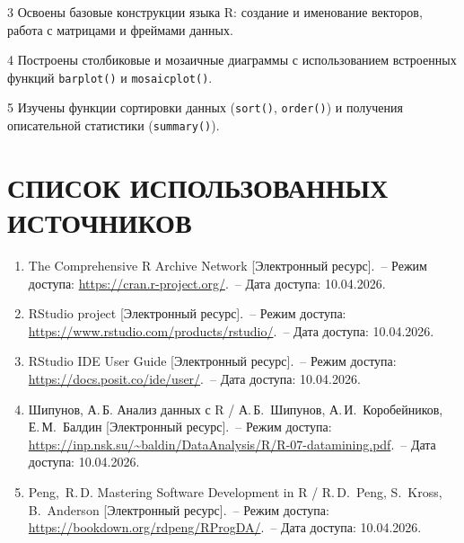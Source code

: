 \documentclass[14pt,a4paper]{extarticle}
\begin{document}
3 Освоены базовые конструкции языка R: создание и именование векторов, работа с матрицами и фреймами данных.

4 Построены столбиковые и мозаичные диаграммы с использованием встроенных функций \texttt{barplot()} и \texttt{mosaicplot()}.

5 Изучены функции сортировки данных (\texttt{sort()}, \texttt{order()}) и получения описательной статистики (\texttt{summary()}).

\newpage

\section*{СПИСОК ИСПОЛЬЗОВАННЫХ ИСТОЧНИКОВ}

\begin{enumerate}[label=\arabic*,leftmargin=1.25cm]
  \item The Comprehensive R Archive Network [Электронный ресурс].~-- Режим доступа: \url{https://cran.r-project.org/}.~-- Дата доступа: 10.04.2026.
  \item RStudio project [Электронный ресурс].~-- Режим доступа: \url{https://www.rstudio.com/products/rstudio/}.~-- Дата доступа: 10.04.2026.
  \item RStudio IDE User Guide [Электронный ресурс].~-- Режим доступа: \url{https://docs.posit.co/ide/user/}.~-- Дата доступа: 10.04.2026.
  \item Шипунов, А.\,Б. Анализ данных с R / А.\,Б.~Шипунов, А.\,И.~Коробейников, Е.\,М.~Балдин [Электронный ресурс].~-- Режим доступа: \url{https://inp.nsk.su/~baldin/DataAnalysis/R/R-07-datamining.pdf}.~-- Дата доступа: 10.04.2026.
  \item Peng,~R.\,D. Mastering Software Development in R / R.\,D.~Peng, S.~Kross, B.~Anderson [Электронный ресурс].~-- Режим доступа: \url{https://bookdown.org/rdpeng/RProgDA/}.~-- Дата доступа: 10.04.2026.
\end{enumerate}
\end{document}
